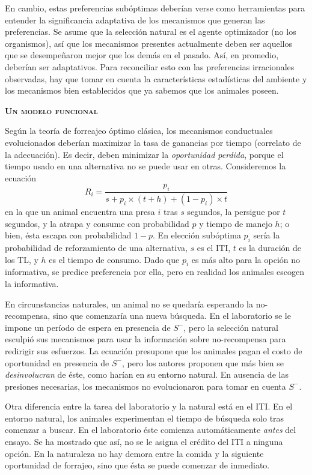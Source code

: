 \documentclass[a4paper,12pt]{article}
\begin{document}
En cambio, estas preferencias subóptimas deberían verse como herramientas para entender la significancia adaptativa de los mecanismos que generan las preferencias. Se asume que la selección natural es el agente optimizador (no los organismos), así que los mecanismos presentes actualmente deben ser aquellos que se desempeñaron mejor que los demás en el pasado. Así, en promedio, deberían ser adaptativos. Para reconciliar esto con las preferencias irracionales observadas, hay que tomar en cuenta la características estadísticas del ambiente y los mecanismos bien establecidos que ya sabemos que los animales poseen.

{\scshape\bfseries Un modelo funcional}

Según la teoría de forreajeo óptimo clásica, los mecanismos conductuales evolucionados deberían maximizar la tasa de ganancias por tiempo (correlato de la adecuación). Es decir, deben minimizar la {\slshape oportunidad perdida}, porque el tiempo usado en una alternativa no se puede usar en otras. Consideremos la ecuación 
$$R_i = \frac{p_i}{s+p_i\times(t+h)+(1-p_i)\times t}$$
en la que un animal encuentra una presa $i$ tras $s$ segundos, la persigue por $t$ segundos, y la atrapa y consume con probabilidad $p$ y tiempo de manejo $h$; o bien, ésta escapa con probabilidad $1-p$. En elección subóptima $p_i$ sería la probabilidad de reforzamiento de una alternativa, $s$ es el ITI, $t$ es la duración de los TL, y $h$ es el tiempo de consumo. Dado que $p_i$ es más alto para la opción no informativa, se predice preferencia por ella, pero en realidad los animales escogen la informativa.

En circunstancias naturales, un animal no se quedaría esperando la no-recompensa, sino que comenzaría una nueva búsqueda. En el laboratorio se le impone un período de espera en presencia de $S^-$, pero la selección natural esculpió sus mecanismos para usar la información sobre no-recompensa para redirigir sus esfuerzos. La ecuación presupone que los animales pagan el costo de oportunidad en presencia de $S^-$, pero los autores proponen que más bien se {\slshape desinvolucran} de éste, como harían en su entorno natural. En ausencia de las presiones necesarias, los mecanismos no evolucionaron para tomar en cuenta $S^-$.

Otra diferencia entre la tarea del laboratorio y la natural está en el ITI. En el entorno natural, los animales experimentan el tiempo de búsqueda solo tras comenzar a buscar. En el laboratorio éste comienza automáticamente {\slshape antes} del ensayo. Se ha mostrado que así, no se le asigna el crédito del ITI a ninguna opción. En la naturaleza no hay demora entre la comida y la siguiente oportunidad de forrajeo, sino que ésta se puede comenzar de inmediato.
\end{document}
